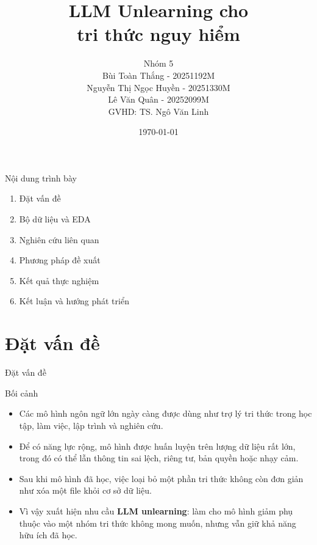 \documentclass[t, aspectratio=169]{beamer}
\title{\texorpdfstring{LLM Unlearning cho\\tri thức nguy hiểm}{LLM Unlearning cho tri thuc nguy hiem}}
\subtitle{}
\author{\texorpdfstring{\small Nhóm 5\\ Bùi Toàn Thắng - 20251192M\\ Nguyễn Thị Ngọc Huyền - 20251330M\\ Lê Văn Quân - 20252099M\\[2pt] GVHD: TS. Ngô Văn Linh}{Nhom 5: Bui Toan Thang, Nguyen Thi Ngoc Huyen, Le Van Quan, GVHD: TS. Ngo Van Linh}}
\institute{}
\date{\today}
\newcommand{\term}[1]{\textbf{\textcolor{hustprimary}{#1}}}
\begin{document}
\hustintropage{}
\husttitlepage

\begin{frame}{Nội dung trình bày}
  \large
  \begin{enumerate}
    \item Đặt vấn đề
    \item Bộ dữ liệu và EDA
    \item Nghiên cứu liên quan
    \item Phương pháp đề xuất
    \item Kết quả thực nghiệm
    \item Kết luận và hướng phát triển
  \end{enumerate}
\end{frame}

\resetPageCount
\showPageNumber
\useStyleHustFull
\useThinBar

\section{Đặt vấn đề}

\begin{frame}{Đặt vấn đề}
  \begin{block}{Bối cảnh}
    \begin{itemize}
      \item Các mô hình ngôn ngữ lớn ngày càng được dùng như trợ lý tri thức trong học tập, làm việc, lập trình và nghiên cứu.
      \item Để có năng lực rộng, mô hình được huấn luyện trên lượng dữ liệu rất lớn, trong đó có thể lẫn thông tin sai lệch, riêng tư, bản quyền hoặc nhạy cảm.
      \item Sau khi mô hình đã học, việc loại bỏ một phần tri thức không còn đơn giản như xóa một file khỏi cơ sở dữ liệu.
      \item Vì vậy xuất hiện nhu cầu \term{LLM unlearning}: làm cho mô hình giảm phụ thuộc vào một nhóm tri thức không mong muốn, nhưng vẫn giữ khả năng hữu ích đã học.
    \end{itemize}
  \end{block}
\end{frame}
\end{document}
